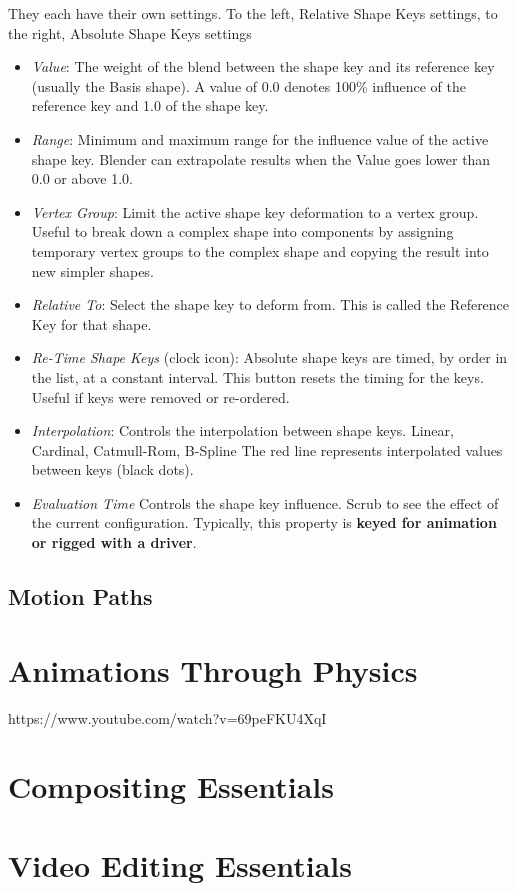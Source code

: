 \documentclass{article}
\begin{document}
They each have their own settings. To the left, Relative Shape Keys settings, to the right, Absolute Shape Keys settings
\begin{multicols}{2}
    \begin{itemize}[noitemsep, topsep=0pt]
        \item \textit{Value}: The weight of the blend between the shape key and its reference key (usually the Basis shape). A value of 0.0 denotes 100\% influence of the reference key and 1.0 of the shape key.
        \item \textit{Range}: Minimum and maximum range for the influence value of the active shape key. Blender can extrapolate results when the Value goes lower than 0.0 or above 1.0.
        \item \textit{Vertex Group}: Limit the active shape key deformation to a vertex group. Useful to break down a complex shape into components by assigning temporary vertex groups to the complex shape and copying the result into new simpler shapes.
        \item \textit{Relative To}: Select the shape key to deform from. This is called the Reference Key for that shape.
    \end{itemize}
   \columnbreak 
    \begin{itemize}[noitemsep, topsep=0pt]
        \item \textit{Re-Time Shape Keys} (clock icon): Absolute shape keys are timed, by order in the list, at a constant interval. This button resets the timing for the keys. Useful if keys were removed or re-ordered.
        \item \textit{Interpolation}: Controls the interpolation between shape keys.  Linear, Cardinal, Catmull-Rom, B-Spline The red line represents interpolated values between keys (black dots).
        \item \textit{Evaluation Time} Controls the shape key influence. Scrub to see the effect of the current configuration. Typically, this property is \textbf{keyed for animation or rigged with a driver}.
    \end{itemize}
\end{multicols}


\subsection{Motion Paths}

\section{Animations Through Physics}
https://www.youtube.com/watch?v=69peFKU4XqI

\section{Compositing Essentials}

\section{Video Editing Essentials}
\end{document}
